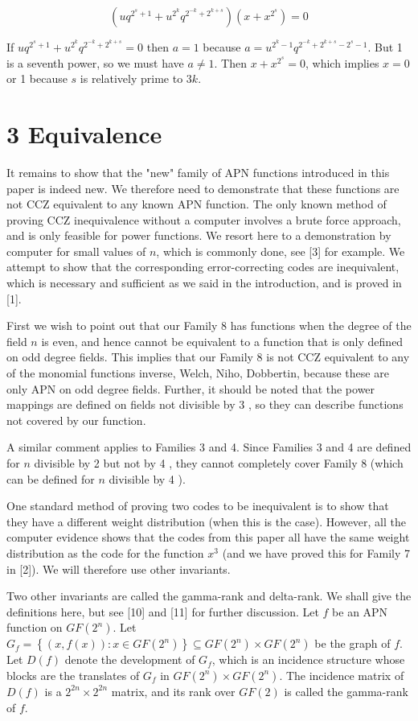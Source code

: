 \documentclass[10pt]{article}
\begin{document}
$$
\left(u q^{2^{s}+1}+u^{2^{k}} q^{2^{-k}+2^{k+s}}\right)\left(x+x^{2^{s}}\right)=0
$$

If $u q^{2^{s}+1}+u^{2^{k}} q^{2^{-k}+2^{k+s}}=0$ then $a=1$ because $a=u^{2^{k}-1} q^{2^{-k}+2^{k+s}-2^{s}-1}$. But 1 is a seventh power, so we must have $a \neq 1$. Then $x+x^{2^{s}}=0$, which implies $x=0$ or 1 because $s$ is relatively prime to $3 k$.

\section*{3 Equivalence}
It remains to show that the "new" family of APN functions introduced in this paper is indeed new. We therefore need to demonstrate that these functions are not CCZ equivalent to any known APN function. The only known method of proving CCZ inequivalence without a computer involves a brute force approach, and is only feasible for power functions. We resort here to a demonstration by computer for small values of $n$, which is commonly done, see [3] for example. We attempt to show that the corresponding error-correcting codes are inequivalent, which is necessary and sufficient as we said in the introduction, and is proved in [1].

First we wish to point out that our Family 8 has functions when the degree of the field $n$ is even, and hence cannot be equivalent to a function that is only defined on odd degree fields. This implies that our Family 8 is not CCZ equivalent to any of the monomial functions inverse, Welch, Niho, Dobbertin, because these are only APN on odd degree fields. Further, it should be noted that the power mappings are defined on fields not divisible by 3 , so they can describe functions not covered by our function.

A similar comment applies to Families 3 and 4. Since Families 3 and 4 are defined for $n$ divisible by 2 but not by 4 , they cannot completely cover Family 8 (which can be defined for $n$ divisible by 4 ).

One standard method of proving two codes to be inequivalent is to show that they have a different weight distribution (when this is the case). However, all the computer evidence shows that the codes from this paper all have the same weight distribution as the code for the function $x^{3}$ (and we have proved this for Family 7 in [2]). We will therefore use other invariants.

Two other invariants are called the gamma-rank and delta-rank. We shall give the definitions here, but see [10] and [11] for further discussion. Let $f$ be an APN function on $G F\left(2^{n}\right)$. Let $G_{f}=\left\{(x, f(x)): x \in G F\left(2^{n}\right)\right\} \subseteq G F\left(2^{n}\right) \times G F\left(2^{n}\right)$ be the graph of $f$. Let $D(f)$ denote the development of $G_{f}$, which is an incidence structure whose blocks are the translates of $G_{f}$ in $G F\left(2^{n}\right) \times G F\left(2^{n}\right)$. The incidence matrix of $D(f)$ is a $2^{2 n} \times 2^{2 n}$ matrix, and its rank over $G F(2)$ is called the gamma-rank of $f$.
\end{document}
